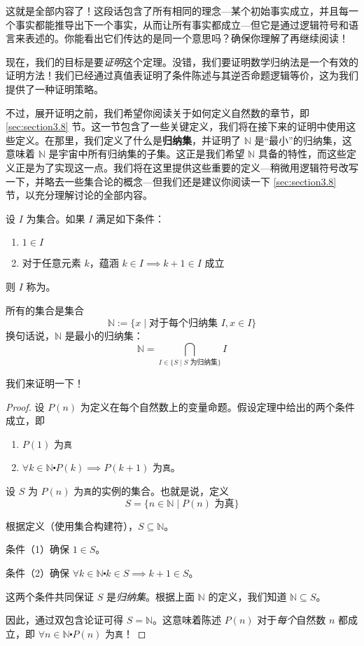 这就是全部内容了！这段话包含了所有相同的理念---某个初始事实成立，并且每一个事实都能推导出下一个事实，从而让所有事实都成立---但它是通过逻辑符号和语言来表述的。你能看出它们传达的是同一个意思吗？确保你理解了再继续阅读！

现在，我们的目标是要\emph{证明}这个定理。没错，我们要证明数学归纳法是一个有效的证明方法！我们已经通过真值表证明了条件陈述与其逆否命题逻辑等价，这为我们提供了一种证明策略。

不过，展开证明之前，我们希望你阅读关于如何定义自然数的章节，即 \ref{sec:section3.8} 节。这一节包含了一些关键定义，我们将在接下来的证明中使用这些定义。在那里，我们定义了什么是\textbf{归纳集}，并证明了 $\mathbb{N}$ 是``最小''的归纳集，这意味着 $\mathbb{N}$ 是宇宙中所有归纳集的子集。这正是我们希望 $\mathbb{N}$ 具备的特性，而这些定义正是为了实现这一点。我们将在这里提供这些重要的定义---稍微用逻辑符号改写一下，并略去一些集合论的概念---但我们还是建议你阅读一下 \ref{sec:section3.8} 节，以充分理解讨论的全部内容。

\begin{definition}
    设 $I$ 为集合。如果 $I$ 满足如下条件：
    \begin{enumerate}
        \item $1 \in I$
        \item 对于任意元素 $k$，蕴涵 $k \in I \implies k + 1 \in I$ 成立
    \end{enumerate}
    则 $I$ 称为。
\end{definition}

\begin{definition}
    所有的集合是集合
    \[\mathbb{N}:=\{x \mid \text{对于每个归纳集 }I, x \in I\}\]
    换句话说，$\mathbb{N}$ 是最小的归纳集：
    \[\mathbb{N} = \bigcap_{I \in \{S \mid S \text{ 为归纳集}\}} I\] 
\end{definition}

我们来证明一下！

\begin{proof}
    设 $P(n)$ 为定义在每个自然数上的变量命题。假设定理中给出的两个条件成立，即
    \begin{enumerate}
        \item $P(1)$ 为\verb|真|
        \item $\forall k \in \mathbb{N} \centerdot P(k) \implies P(k+1)$ 为\verb|真|。
    \end{enumerate}

    设 $S$ 为 $P(n)$ 为\verb|真|的实例的集合。也就是说，定义
    \[S = \{n \in \mathbb{N} \mid P(n) \text{ 为真}\}\]

    根据定义（使用集合构建符），$S \subseteq \mathbb{N}$。

    条件（1）确保 $1 \in S$。

    条件（2）确保 $\forall k \in \mathbb{N} \centerdot k \in S \implies k+1 \in S$。

    这两个条件共同保证 $S$ 是\emph{归纳集}。根据上面 $\mathbb{N}$ 的定义，我们知道 $\mathbb{N} \subseteq S$。

    因此，通过双包含论证可得 $S = \mathbb{N}$。这意味着陈述 $P(n)$ 对于\emph{每个}自然数 $n$ 都成立，即 $\forall n \in \mathbb{N} \centerdot P(n)$ 为\verb|真|！
\end{proof}

